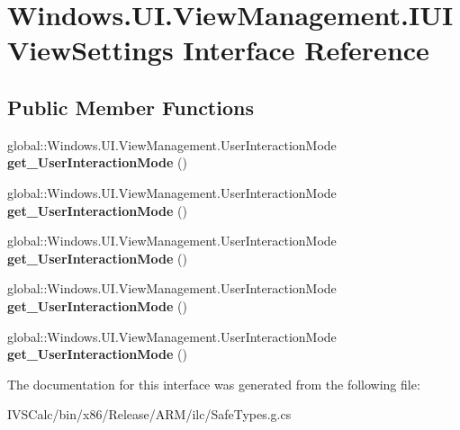 \hypertarget{interface_windows_1_1_u_i_1_1_view_management_1_1_i_u_i_view_settings}{}\section{Windows.\+U\+I.\+View\+Management.\+I\+U\+I\+View\+Settings Interface Reference}
\label{interface_windows_1_1_u_i_1_1_view_management_1_1_i_u_i_view_settings}
\subsection*{Public Member Functions}
\begin{DoxyCompactItemize}
\item 
\mbox{\label{interface_windows_1_1_u_i_1_1_view_management_1_1_i_u_i_view_settings_ad69d735372d64ee37f998f4588d3c37e}} 
global\+::\+Windows.\+U\+I.\+View\+Management.\+User\+Interaction\+Mode {\bfseries get\+\_\+\+User\+Interaction\+Mode} ()
\item 
\mbox{\label{interface_windows_1_1_u_i_1_1_view_management_1_1_i_u_i_view_settings_ad69d735372d64ee37f998f4588d3c37e}} 
global\+::\+Windows.\+U\+I.\+View\+Management.\+User\+Interaction\+Mode {\bfseries get\+\_\+\+User\+Interaction\+Mode} ()
\item 
\mbox{\label{interface_windows_1_1_u_i_1_1_view_management_1_1_i_u_i_view_settings_ad69d735372d64ee37f998f4588d3c37e}} 
global\+::\+Windows.\+U\+I.\+View\+Management.\+User\+Interaction\+Mode {\bfseries get\+\_\+\+User\+Interaction\+Mode} ()
\item 
\mbox{\label{interface_windows_1_1_u_i_1_1_view_management_1_1_i_u_i_view_settings_ad69d735372d64ee37f998f4588d3c37e}} 
global\+::\+Windows.\+U\+I.\+View\+Management.\+User\+Interaction\+Mode {\bfseries get\+\_\+\+User\+Interaction\+Mode} ()
\item 
\mbox{\label{interface_windows_1_1_u_i_1_1_view_management_1_1_i_u_i_view_settings_ad69d735372d64ee37f998f4588d3c37e}} 
global\+::\+Windows.\+U\+I.\+View\+Management.\+User\+Interaction\+Mode {\bfseries get\+\_\+\+User\+Interaction\+Mode} ()
\end{DoxyCompactItemize}


The documentation for this interface was generated from the following file\+:\begin{DoxyCompactItemize}
\item 
I\+V\+S\+Calc/bin/x86/\+Release/\+A\+R\+M/ilc/Safe\+Types.\+g.\+cs\end{DoxyCompactItemize}
